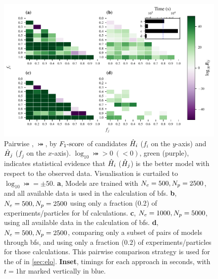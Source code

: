 \begin{figure}
    \includegraphics{theoretical_study/figures/bayes_factors_by_f_scores.pdf}
    \caption[ by $\fs$.]{
        Pairwise , $\bij$, by $\fs$ of candidates $\hat{H}_i$ ($f_i$ on the $y$-axis) 
        and $\hat{H}_j$ ($f_j$ on the $x$-axis).
        $\log_{10}\bij > 0 \ (<0)$, green (purple), indicates statistical evidence that $\hat{H}_i$ ($\hat{H}_j$) 
        is the better model with respect to the observed data.
        Visualisation is curtailed to $\log_{10} \bij = \pm 50$. 
        \textbf{a}, Models are trained with $N_e=500, N_p=2500$,
            and all available data is used in the calculation of \glspl{bf}. 
        \textbf{b}, $N_e=500, N_p=2500$ using only a fraction (0.2) of experiments/particles for \gls{bf} calculations. 
        \textbf{c}, $N_e=1000, N_p=5000$, using all available data in the calculation of \glspl{bf}. 
        \textbf{d}, $N_e=500, N_p=2500$, comparing only a subset of pairs of models through \glspl{bf}, 
            and using only a fraction ($0.2$) of experiments/particles for those calculations. 
            This pairwise comparison strategy is used for the \gls{of} in \cref{sec:elo}. 
        \textbf{Inset}, timings for each approach in seconds, with $t=1\textrm{hr}$ marked vertically in blue. 
        \figtableref
    }
    \label{fig:bf_by_fscore}
\end{figure}


